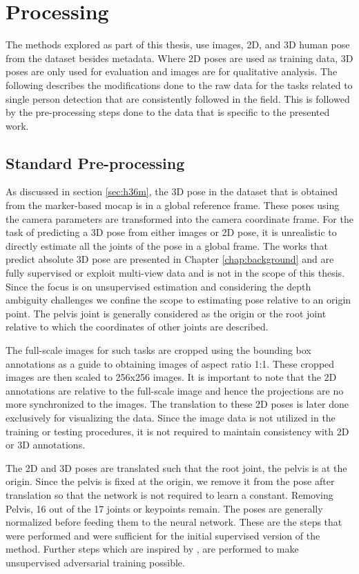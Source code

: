 \section{Processing}
\label{sec:processing}
The methods explored as part of this thesis, use images, 2D, and 3D human pose from the dataset besides metadata. Where 2D poses are used as training data, 3D poses are only used for evaluation and images are for qualitative analysis. The following describes the modifications done to the raw data for the tasks related to single person detection that are consistently followed in the field. This is followed by the pre-processing steps done to the data that is specific to the presented work.

\subsection{Standard Pre-processing}
As discussed in section \ref{sec:h36m}, the 3D pose in the dataset that is obtained from the marker-based \ac{mocap} is in a global reference frame. These poses using the camera parameters are transformed into the camera coordinate frame. For the task of predicting a 3D pose from either images or 2D pose, it is unrealistic to directly estimate all the joints of the pose in a global frame. The works that predict absolute 3D pose are presented in Chapter \ref{chap:background} and are fully supervised or exploit multi-view data and is not in the scope of this thesis. Since the focus is on unsupervised estimation and considering the depth ambiguity challenges we confine the scope to estimating pose relative to an origin point. The pelvis joint is generally considered as the origin or the root joint relative to which the coordinates of other joints are described. 

The full-scale images for such tasks are cropped using the bounding box annotations as a guide to obtaining images of aspect ratio 1:1. These cropped images are then scaled to 256x256 images. It is important to note that the 2D annotations are relative to the full-scale image and hence the projections are no more synchronized to the images. The translation to these 2D poses is later done exclusively for visualizing the data. Since the image data is not utilized in the training or testing procedures, it is not required to maintain consistency with 2D or 3D annotations. 

The 2D and 3D poses are translated such that the root joint, the pelvis is at the origin. Since the pelvis is fixed at the origin, we remove it from the pose after translation so that the network is not required to learn a constant. Removing Pelvis, 16 out of the 17 joints or keypoints remain. The poses are generally normalized before feeding them to the neural network. These are the steps that were performed and were sufficient for the initial supervised version of the method. Further steps which are inspired by \cite{amazon1}, are performed to make unsupervised adversarial training possible. 

